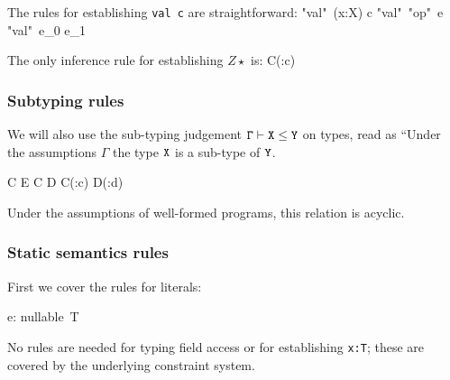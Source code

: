 \documentclass[nocopyrightspace,preprint,10pt]{sigplanconf}
\begin{document}
The rules for establishing {\tt val c} are straightforward:
        {\Gamma \vdash "val"~(\exists x:X) c}
        {\Gamma \vdash "val"~"op"~e}
        {\Gamma \vdash "val"~e_0  e_1}

The only inference rule for establishing $Z\star$ is:
        {\Gamma \vdash C(:c)\star}

\subsubsection{Subtyping rules}
We will also use the sub-typing judgement $\tt \Gamma \vdash X \leq Y$
on types, read as ``Under the assumptions $\Gamma$ the type $\tt X$ is
a sub-type of $\tt Y$.

        {\Gamma \vdash C \leq E}
        {\Gamma \vdash C \leq D}
        {\Gamma \vdash C(:c) \leq D(:d)}

Under the assumptions of well-formed programs, this relation is acyclic.

\subsubsection{Static semantics rules}
First we cover the rules for literals:

        {\Gamma \vdash e: nullable\ T} 

\noindent No rules are needed for typing field access or for
establishing {\tt x:T}; these are covered by the underlying constraint system.
\end{document}
